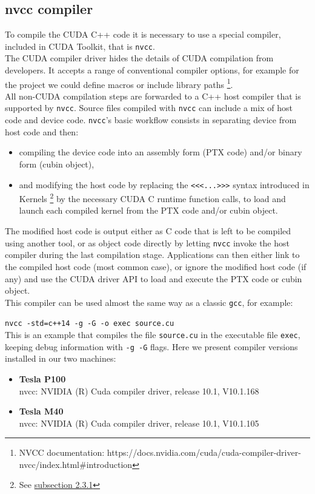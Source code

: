 \subsection{nvcc compiler}
	To compile the CUDA C++ code it is necessary to use a special compiler, included in CUDA Toolkit, that is \texttt{nvcc}.\\
	The CUDA compiler driver hides the details of CUDA compilation from developers. It accepts a range of conventional compiler options, for example for the project we could define macros or include library paths \footnote{NVCC documentation: https://docs.nvidia.com/cuda/cuda-compiler-driver-nvcc/index.html\#introduction}.\\ 
	All non-CUDA compilation steps are forwarded to a C++ host compiler that is supported by \texttt{nvcc}. 
	Source files compiled with \texttt{nvcc} can include a mix of host code and device code. \texttt{nvcc}'s basic
	workflow consists in separating device from host code and then:
	\begin{itemize}
		\item compiling the device code into an assembly form (PTX code) and/or binary form (cubin object), \item and modifying the host code by replacing the \texttt{<<<...>>>} syntax introduced in	Kernels \footnote{See  \hyperref[subs:ker]{subsection 2.3.1}} by the necessary CUDA C runtime function calls, to load and launch each compiled kernel from the PTX code and/or cubin object.
	\end{itemize}
	The modified host code is output either as C code that is left to be compiled using another tool, or as object code directly by letting \texttt{nvcc} invoke the host compiler during	the last compilation stage.
	Applications can then either link to the compiled host code (most common case), or ignore the modified host code (if any) and use the CUDA driver API to load and execute the PTX code or cubin object.\\
	This compiler can be used almost the same way as a classic \texttt{gcc}, for example:
	
	\texttt{nvcc -std=c++14 -g -G -o exec source.cu}\\
	This is an example that compiles the file \texttt{source.cu} in the executable file \texttt{exec}, keeping debug information with \texttt{-g -G} flags.
	Here we present compiler versions installed in our two machines:	
	\begin{itemize}
		\item \textbf{Tesla P100}\\
		nvcc: NVIDIA (R) Cuda compiler driver, release 10.1, V10.1.168			
		
		\item \textbf{Tesla M40}\\
		nvcc: NVIDIA (R) Cuda compiler driver, release 10.1, V10.1.105
	\end{itemize}

